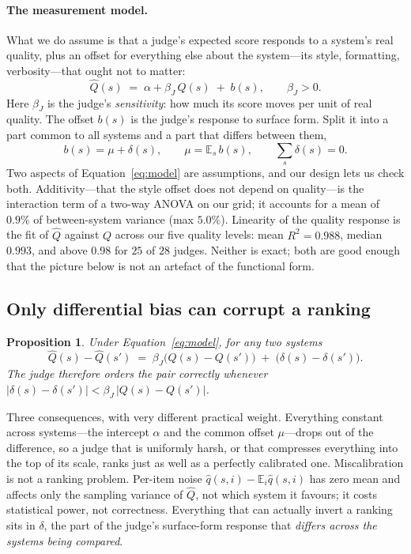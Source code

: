 \documentclass{article}
\theoremstyle{plain}
\newtheorem{proposition}[theorem]{Proposition}
\theoremstyle{definition}
\newcommand{\qhat}{\hat{q}}
\newcommand{\Qhat}{\hat{Q}}
\begin{document}
\paragraph{The measurement model.} What we do assume is that a judge's expected score responds
to a system's real quality, plus an offset for everything else about the system---its style,
formatting, verbosity---that ought not to matter:
\begin{equation}
\Qhat(s) \;=\; \alpha + \beta_J\,Q(s) \;+\; b(s), \qquad \beta_J>0 .
\label{eq:model}
\end{equation}
Here $\beta_J$ is the judge's \emph{sensitivity}: how much its score moves per unit of real
quality. The offset $b(s)$ is the judge's response to surface form. Split it into a part common
to all systems and a part that differs between them,
\[
b(s)=\mu+\delta(s), \qquad \mu=\mathbb{E}_s\,b(s), \qquad \textstyle\sum_s\delta(s)=0 .
\]
Two aspects of Equation~\ref{eq:model} are assumptions, and our design lets us check both.
Additivity---that the style offset does not depend on quality---is the interaction term of a
two-way ANOVA on our grid; it accounts for a mean of $0.9\%$ of between-system variance (max
$5.0\%$). Linearity of the quality response is the fit of $\Qhat$ against $Q$ across our five
quality levels: mean $R^2=0.988$, median $0.993$, and above $0.98$ for $25$ of $28$ judges.
Neither is exact; both are good enough that the picture below is not an artefact of the
functional form.

\subsection{Only differential bias can corrupt a ranking}

\begin{proposition}
\label{prop:decomp}
Under Equation~\ref{eq:model}, for any two systems
\[
\Qhat(s)-\Qhat(s') \;=\; \beta_J\bigl(Q(s)-Q(s')\bigr) \;+\; \bigl(\delta(s)-\delta(s')\bigr).
\]
The judge therefore orders the pair correctly whenever
$|\delta(s)-\delta(s')| < \beta_J\,|Q(s)-Q(s')|$.
\end{proposition}

Three consequences, with very different practical weight. Everything constant across
systems---the intercept $\alpha$ and the common offset $\mu$---drops out of the difference, so a
judge that is uniformly harsh, or that compresses everything into the top of its scale, ranks
just as well as a perfectly calibrated one. Miscalibration is not a ranking problem. Per-item noise $\qhat(s,i)-\mathbb{E}_i\qhat(s,i)$
has zero mean and affects only the sampling variance of $\Qhat$, not which system it favours;
it costs statistical power, not correctness. Everything that can actually invert a ranking sits
in $\delta$, the part of the judge's surface-form response that \emph{differs across the
systems being compared}.
\end{document}
